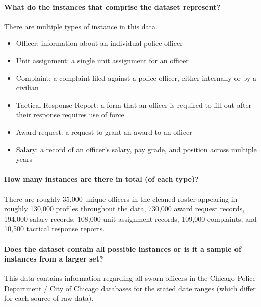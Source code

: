 \paragraph{What do the instances that comprise the dataset represent?}
There are multiple types of instance in this data. 
\begin{itemize}
\item Officer: information about an individual police officer
\item Unit assignment: a single unit assignment for an officer
\item Complaint: a complaint filed against a police officer, either internally or by a civilian
\item Tactical Response Report: a form that an officer is required to fill out after their response requires use of force
\item Award request: a request to grant an award to an officer
\item Salary: a record of an officer's salary, pay grade, and position across multiple years
\end{itemize}

\paragraph{How many instances are there in total (of each type)?}
There are roughly 35,000 unique officers in the cleaned roster appearing in roughly 130,000 profiles throughout the data,
730,000 award request records,
194,000 salary records,
108,000 unit assignment records,
109,000 complaints,
and 10,500 tactical response reports.

\paragraph{Does the dataset contain all possible instances or is it a sample of instances from a larger set?}
This data contains information regarding all sworn officers in the Chicago Police Department / City of Chicago
databases for the stated date ranges (which differ for each source of raw data).

